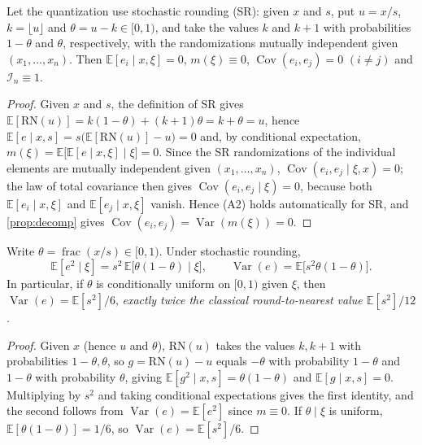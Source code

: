 \documentclass[twocolumn,review,hidelinks,oneeqnum,onetabnum,onefignum,onethmnum]{siamart251216}
\begin{document}
\begin{proposition}
\label{prop:sr}
Let the quantization use stochastic rounding (SR): given $x$ and $s$, put
$u=x/s$, $k=\lfloor u\rfloor$ and $\theta=u-k\in[0,1)$, and take the values
$k$ and $k+1$ with probabilities $1-\theta$ and $\theta$, respectively, with
the randomizations mutually independent given $(x_1,\dots,x_n)$. Then
$\mathbb{E}[e_i\mid x,\xi]=0$, $m(\xi)\equiv0$,
$\operatorname{Cov}(e_i,e_j)=0$ $(i\ne j)$ and $\mathcal I_n\equiv1$.
\end{proposition}

\begin{proof}
Given $x$ and $s$, the definition of SR gives
$\mathbb{E}[\mathrm{RN}(u)]=k(1-\theta)+(k+1)\theta=k+\theta=u$, hence
$\mathbb{E}[e\mid x,s]=s\bigl(\mathbb{E}[\mathrm{RN}(u)]-u\bigr)=0$ and, by
conditional expectation,
$m(\xi)=\mathbb{E}\bigl[\mathbb{E}[e\mid x,\xi]\mid\xi\bigr]=0$. Since the SR
randomizations of the individual elements are mutually independent given
$(x_1,\dots,x_n)$, $\operatorname{Cov}(e_i,e_j\mid\xi,x)=0$; the law of total
covariance then gives $\operatorname{Cov}(e_i,e_j\mid\xi)=0$, because both
$\mathbb{E}[e_i\mid x,\xi]$ and $\mathbb{E}[e_j\mid x,\xi]$ vanish. Hence (A2)
holds automatically for SR, and \cref{prop:decomp} gives
$\operatorname{Cov}(e_i,e_j)=\operatorname{Var}(m(\xi))=0$.
\end{proof}

\begin{corollary}
\label{cor:srvar}
Write $\theta=\operatorname{frac}(x/s)\in[0,1)$. Under stochastic rounding,
\begin{equation}
\mathbb{E}[e^2\mid\xi]=s^2\,\mathbb{E}\bigl[\theta(1-\theta)\mid\xi\bigr],
\qquad
\operatorname{Var}(e)=\mathbb{E}\bigl[s^2\theta(1-\theta)\bigr].
\label{eq:srvar}
\end{equation}
In particular, if $\theta$ is conditionally uniform on $[0,1)$ given $\xi$, then
$\operatorname{Var}(e)=\mathbb{E}[s^2]/6$, \emph{exactly twice the classical
round-to-nearest value $\mathbb{E}[s^2]/12$}.
\end{corollary}

\begin{proof}
Given $x$ (hence $u$ and $\theta$), $\mathrm{RN}(u)$ takes the values $k,k+1$ with
probabilities $1-\theta,\theta$, so $g=\mathrm{RN}(u)-u$ equals $-\theta$ with
probability $1-\theta$ and $1-\theta$ with probability $\theta$, giving
$\mathbb{E}[g^2\mid x,s]=\theta(1-\theta)$ and $\mathbb{E}[g\mid x,s]=0$.
Multiplying by $s^2$ and taking conditional expectations gives the first
identity, and the second follows from $\operatorname{Var}(e)=\mathbb{E}[e^2]$
since $m\equiv0$. If $\theta\mid\xi$ is uniform,
$\mathbb{E}[\theta(1-\theta)]=1/6$, so $\operatorname{Var}(e)=\mathbb{E}[s^2]/6$.
\end{proof}
\end{document}
